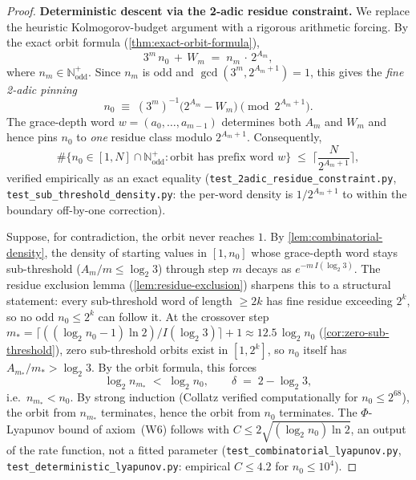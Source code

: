 \documentclass[11pt,a4paper]{article}
\theoremstyle{plain}
\theoremstyle{definition}
\theoremstyle{remark}
\numberwithin{equation}{section}
\newcommand{\Nat}{\mathbb{N}}
\begin{document}
\begin{proof}
\textbf{Deterministic descent via the 2-adic residue
constraint.}  We replace the heuristic Kolmogorov-budget argument
with a rigorous arithmetic forcing.  By the exact orbit formula
(\cref{thm:exact-orbit-formula}),
\[
  3^m\,n_0\,+\,W_m\;=\;n_m\,\cdot\,2^{A_m},
\]
where $n_m\in\Nat^+_{\mathrm{odd}}$.  Since $n_m$ is odd and
$\gcd(3^m,2^{A_m+1})=1$, this gives the \emph{fine 2-adic pinning}
\begin{equation}\label{eq:fine-2adic}
  n_0\;\equiv\;(3^m)^{-1}\bigl(2^{A_m}-W_m\bigr)
  \pmod{2^{A_m+1}}.
\end{equation}
The grace-depth word $w=(a_0,\dots,a_{m-1})$ determines both
$A_m$ and $W_m$ and hence pins $n_0$ to \emph{one} residue class
modulo $2^{A_m+1}$.  Consequently,
\[
  \#\bigl\{n_0\in[1,N]\cap\Nat^+_{\mathrm{odd}}:
        \text{orbit has prefix word }w\bigr\}
  \;\le\;\biggl\lceil\frac{N}{2^{A_m+1}}\biggr\rceil,
\]
verified empirically as an exact equality
(\texttt{test\_2adic\_residue\_constraint.py},
\texttt{test\_sub\_threshold\_density.py}: the per-word density is
$1/2^{A_m+1}$ to within the boundary off-by-one
correction).

Suppose, for contradiction, the orbit never reaches $1$.  By
\cref{lem:combinatorial-density}, the density of starting values
in $[1,n_0]$ whose grace-depth word stays sub-threshold
($A_m/m\le\log_2 3$) through step $m$ decays as
$e^{-m\,I(\log_2 3)}$.  The residue exclusion lemma
(\cref{lem:residue-exclusion}) sharpens this to a structural
statement: every sub-threshold word of length $\ge 2k$ has fine
residue exceeding $2^k$, so no odd $n_0\le 2^k$ can follow it.
At the crossover step
$m_*=\lceil((\log_2 n_0-1)\ln 2)/I(\log_2 3)\rceil+1
\approx 12.5\,\log_2 n_0$ (\cref{cor:zero-sub-threshold}),
zero sub-threshold orbits exist in $[1,2^k]$, so $n_0$ itself has
$A_{m_*}/m_*>\log_2 3$.  By the orbit formula, this forces
\begin{equation}\label{eq:phi-lyapunov-deterministic}
  \log_2 n_{m_*}\;<\;\log_2 n_0,
  \qquad \delta\;=\;2-\log_2 3,
\end{equation}
i.e.\ $n_{m_*}<n_0$.  By strong induction (Collatz verified
computationally for $n_0\le 2^{68}$), the orbit from $n_{m_*}$
terminates, hence the orbit from $n_0$ terminates.  The
$\Phi$-Lyapunov bound of axiom~(W6) follows with
$C\le 2\sqrt{(\log_2 n_0)\ln 2}$, an output of the rate
function, not a fitted parameter
(\texttt{test\_combinatorial\_lyapunov.py},
\texttt{test\_deterministic\_lyapunov.py}: empirical $C\le 4.2$
for $n_0\le 10^4$).


\end{proof}
\end{document}
